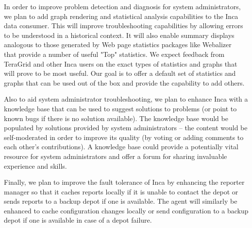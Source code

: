 \documentclass[times,10pt,twocolumn]{article}
\begin{document}

In order to improve problem detection and diagnosis for system administrators,
we plan to add graph rendering and statistical
analysis capabilities to the Inca data consumer.  This will improve troubleshooting capabilities by
allowing errors to be understood in a historical context.  It will also enable
summary displays analogous to those generated by Web page statistics packages
like Webalizer~\cite{webalizer} that provide a number of useful "Top"
statistics.  We expect feedback from TeraGrid and other Inca users on the
exact types of statistics and graphs that will prove to be most useful.  Our
goal is to offer a default set of statistics and graphs that can be used out
of the box and provide the capability to add others.

Also to aid system administrator troubleshooting,
we plan to enhance Inca with a knowledge base that can be used to
suggest solutions to problems (or point to known bugs if there is no solution
available).  The knowledge base would be populated by solutions provided by
system administrators -- the content would be self-moderated in order to
improve its quality (by voting or adding comments to each other's
contributions).  A knowledge base could provide a potentially vital resource
for system administrators and offer a forum for sharing
invaluable experience and skills.   

Finally, we plan to improve the fault tolerance of Inca by enhancing the
reporter manager so that it caches reports locally if it is unable to
contact the depot or sends reports to a backup depot if one is available.
The agent will similarly be enhanced to cache configuration changes locally or
send configuration to a backup depot if one is available in case of a depot
failure.

\end{document}
